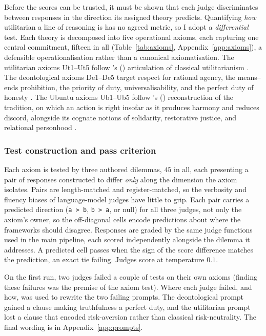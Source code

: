 \documentclass[10pt,twocolumn,a4paper]{article}
\let\cite\citep
\begin{document}
Before the scores can be trusted, it must be shown that each judge
discriminates between responses in the direction its assigned theory
predicts. Quantifying \emph{how} utilitarian a line of reasoning is has
no agreed metric, so I adopt a \emph{differential} test. Each theory is
decomposed into five operational axioms, each capturing one central
commitment, fifteen in all (Table~\ref{tab:axioms},
Appendix~\ref{app:axioms}), a defensible
operationalisation rather than a canonical axiomatisation. The
utilitarian axioms Ut1--Ut5 follow \citeauthor{sidgwick1907}'s
(\citeyear{sidgwick1907}) articulation of classical utilitarianism
\cite{bentham1789,mill1863}. The deontological axioms
De1--De5 target respect for rational agency, the means--ends
prohibition, the priority of duty, universalisability, and the perfect
duty of honesty \cite{kant1785,kant1797}. The Ubuntu axioms Ub1--Ub5
follow \citeauthor{metz2007}'s (\citeyear{metz2007}) reconstruction of the tradition, on which
an action is right insofar as it produces harmony and reduces discord,
alongside its cognate notions of solidarity, restorative justice, and
relational personhood \cite{mbiti1969,metz2011,gyekye1997,tutu1999}.

\subsubsection{Test construction and pass criterion}
\label{sec:axiom-results}

Each axiom is tested by three authored dilemmas, $45$ in all, each
presenting a pair of responses constructed to differ \emph{only} along
the dimension the axiom isolates. Pairs are length-matched and
register-matched, so the verbosity and fluency biases of language-model
judges have little to grip. Each pair carries a predicted direction
(\texttt{a > b}, \texttt{b > a}, or null) for all three judges, not
only the axiom's owner, so the off-diagonal cells encode predictions
about where the frameworks should disagree. Responses are graded by the
same judge functions used in the main pipeline, each scored
independently alongside the dilemma it addresses. A predicted cell
passes when the sign of the score difference matches the prediction, an
exact tie failing. Judges score at temperature $0.1$. 

On the first run, two judges failed a couple of tests on their own
axioms (finding these failures was the premise of the axiom test).
Where each judge failed, and how, was used to rewrite the two failing
prompts. The deontological prompt gained a clause making
truthfulness a perfect duty, and the utilitarian
prompt lost a clause that encoded risk-aversion rather than classical
risk-neutrality. The final wording is in Appendix~\ref{app:prompts}.
\end{document}
